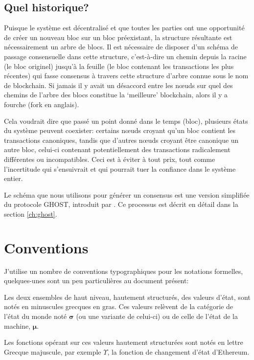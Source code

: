 \documentclass[9pt,oneside]{amsart}
\begin{document}
\begin{multicols}{2}
\subsection{Quel historique?}

Puisque le système est décentralisé et que toutes les parties ont une opportunité de créer un nouveau bloc sur un bloc préexistant, la structure résultante est nécessairement un arbre de blocs. Il est nécessaire de disposer d’un schéma de passage consensuelle dans cette structure, c’est-à-dire un chemin depuis la racine (le bloc originel) jusqu'à la feuille (le bloc contenant les transactions les plus récentes) qui fasse consensus à travers cette structure d'arbre connue sous le nom de blockchain. Si jamais il y avait un désaccord entre les n\oe{}uds sur quel des chemins de l'arbre des blocs constitue la `meilleure' blockchain, alors il y a fourche (fork en anglais).  

Cela voudrait dire que passé un point donné dans le temps (bloc), plusieurs états du système peuvent coexister: certains n\oe{}uds croyant qu'un bloc contient les transactions canoniques, tandis que d'autres n\oe{}uds croyant être canonique un autre bloc, celui-ci contenant potentiellement des transactions radicalement différentes ou incompatibles. Ceci est à éviter à tout prix, tout comme l'incertitude qui s'ensuivrait et qui pourrait tuer la confiance dans le système entier. 

Le schéma que nous utilisons pour générer un consensus est une version simplifiée du protocole GHOST, introduit par \cite{cryptoeprint:2013:881}. Ce processus est décrit en détail dans la section \ref{ch:ghost}.

\section{Conventions}\label{ch:conventions}

J'utilise un nombre de conventions typographiques pour les notations formelles, quelques-unes sont un peu particulières au document présent:

Les deux ensembles de haut niveau, hautement structurés, des valeurs d'état, sont notés en minuscules grecques en gras. Ces valeurs relèvent de la catégorie de l'état du monde noté $\boldsymbol{\sigma}$ (ou une variante de celui-ci) ou de celle de l'état de la machine, $\boldsymbol{\mu}$.

Les fonctions opérant sur ces valeurs hautement structurées sont notés en lettre Grecque majuscule, par exemple $\Upsilon$, la fonction de changement d'état d'Ethereum.


\end{multicols}
\end{document}
